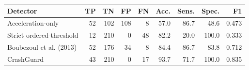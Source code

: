 \begin{tabular}{@{}lrrrrrrrr@{}}\toprule Detector & TP & TN & FP & FN & Acc. & Sens. & Spec. & F1\\\midrule
Acceleration-only & 52 & 102 & 108 & 8 & 57.0 & 86.7 & 48.6 & 0.473 \\
Strict ordered-threshold & 12 & 210 & 0 & 48 & 82.2 & 20.0 & 100.0 & 0.333 \\
Boubezoul et al. (2013) & 52 & 176 & 34 & 8 & 84.4 & 86.7 & 83.8 & 0.712 \\
CrashGuard & 43 & 210 & 0 & 17 & 93.7 & 71.7 & 100.0 & 0.835 \\
\bottomrule\end{tabular}